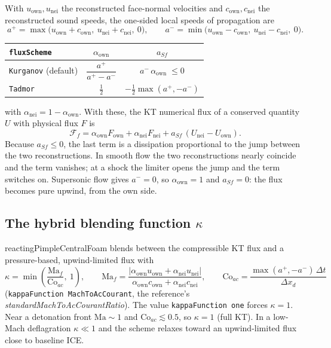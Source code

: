 \documentclass[11pt]{article}
\newcommand{\code}[1]{\texttt{\small #1}}
\newcommand{\own}{\mathrm{own}}
\newcommand{\nei}{\mathrm{nei}}
\newcommand{\dt}{\Delta t}
\begin{document}
With $u_\own,u_\nei$ the reconstructed face-normal velocities and $c_\own,c_\nei$ the
reconstructed sound speeds, the one-sided local speeds of propagation are
\begin{equation}
  a^+ = \max\bigl(u_\own+c_\own,\ u_\nei+c_\nei,\ 0\bigr),\qquad
  a^- = \min\bigl(u_\own-c_\own,\ u_\nei-c_\nei,\ 0\bigr).
\end{equation}
\begin{center}
\begin{tabular}{@{}l c c@{}}
\toprule
\code{fluxScheme} & $\alpha_\own$ & $a_{Sf}$ \\
\midrule
\code{Kurganov} (default) & $\dfrac{a^+}{a^+-a^-}$ & $a^-\,\alpha_\own \;\le 0$ \\[2mm]
\code{Tadmor} & $\tfrac12$ & $-\tfrac12\max(a^+,-a^-)$ \\
\bottomrule
\end{tabular}
\end{center}
with $\alpha_\nei = 1-\alpha_\own$. With these, the KT numerical flux of a conserved
quantity $U$ with physical flux $F$ is
\begin{equation}
  \mathcal F_f = \alpha_\own F_\own + \alpha_\nei F_\nei + a_{Sf}\,(U_\nei - U_\own).
  \label{eq:kt}
\end{equation}
Because $a_{Sf}\le 0$, the last term is a dissipation proportional to the jump
between the two reconstructions. In smooth flow the two reconstructions nearly coincide and
the term vanishes; at a shock the limiter opens the jump and the term switches on.
Supersonic flow gives $a^-=0$, so $\alpha_\own=1$ and $a_{Sf}=0$: the flux becomes pure
upwind, from the own side.

\subsection{The hybrid blending function \texorpdfstring{$\kappa$}{kappa}}

reactingPimpleCentralFoam blends between the compressible KT flux and a pressure-based,
upwind-limited flux with
\begin{equation}
  \kappa = \min\!\left(\frac{\mathrm{Ma}_f}{\mathrm{Co}_{ac}},\ 1\right),\qquad
  \mathrm{Ma}_f = \frac{|\alpha_\own u_\own + \alpha_\nei u_\nei|}{\alpha_\own c_\own + \alpha_\nei c_\nei},\qquad
  \mathrm{Co}_{ac} = \frac{\max(a^+,-a^-)\,\dt}{\Delta x_d}
\end{equation}
(\code{kappaFunction MachToAcCourant}, the reference's \emph{standardMachToAcCourantRatio}).
The value \code{kappaFunction one} forces $\kappa=1$. Near a detonation front
$\mathrm{Ma}\sim 1$ and $\mathrm{Co}_{ac}\lesssim 0.5$, so $\kappa=1$ (full KT). In a
low-Mach deflagration $\kappa\ll 1$ and the scheme relaxes toward an upwind-limited flux
close to baseline ICE.
\end{document}
